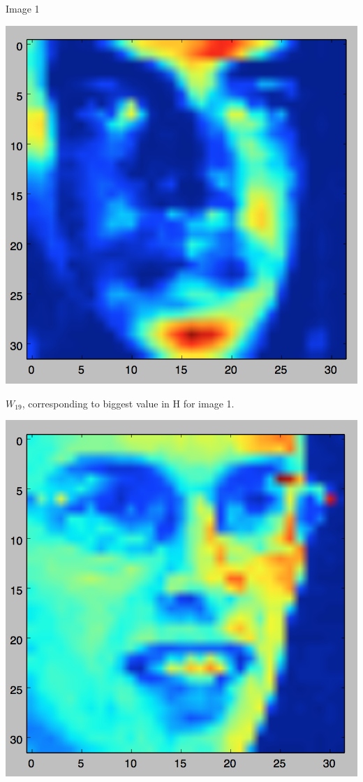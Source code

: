\documentclass[11pt]{article}
\begin{document}
Image 1

\includegraphics[scale=.5]{images/img1_W19}

$W_{19}$, corresponding to biggest value in H for image 1.

\includegraphics[scale=.5]{images/img20}
\end{document}
